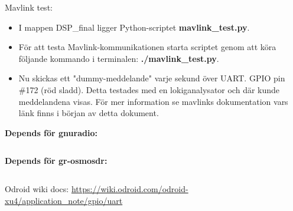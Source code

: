 \documentclass[11pt, a4paper]{report}
\begin{document}
\newpage
Mavlink test:
\begin{itemize}
    \item I mappen DSP\_final ligger Python-scriptet \textbf{mavlink\_test.py}.
    \item För att testa Mavlink-kommunikationen starta scriptet genom att köra följande kommando i terminalen: \textbf{./mavlink\_test.py}.
    \item Nu skickas ett "dummy-meddelande" varje sekund över UART. GPIO pin \#172 (röd sladd). Detta testades med en lokiganalysator och där kunde meddelandena visas. För mer information se mavlinks dokumentation vars länk finns i början av detta dokument.
\end{itemize}

\newpage
\textbf{Depends för gnuradio:}
\inputminted{text}{gnuradio-depends.txt}

\newpage
\textbf{Depends för gr-osmosdr:}
\inputminted{text}{gr-osmosdr-depends.txt}

\newpage
Odroid wiki docs: \url{https://wiki.odroid.com/odroid-xu4/application_note/gpio/uart}
\end{document}
